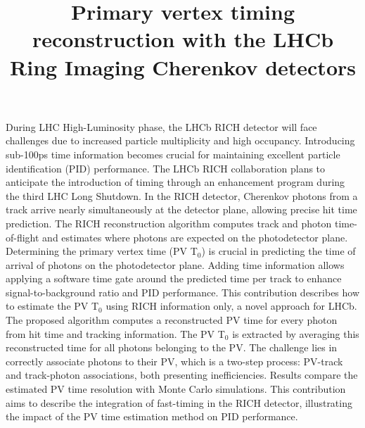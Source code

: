 \documentclass{article}
\title{Primary vertex timing reconstruction with the LHCb Ring Imaging Cherenkov detectors }
\date{}
\begin{document}
\maketitle

During LHC High-Luminosity phase, the LHCb RICH detector will face challenges due to increased particle multiplicity and high occupancy. Introducing sub-100ps time information becomes crucial for maintaining excellent particle identification (PID) performance. The LHCb RICH collaboration plans to anticipate the introduction of timing through an enhancement program during the third LHC Long Shutdown. In the RICH detector, Cherenkov photons from a track arrive nearly simultaneously at the detector plane, allowing precise hit time prediction. The RICH reconstruction algorithm computes track and photon time-of-flight and estimates where photons are expected on the photodetector plane. Determining the primary vertex time (PV T$_0$) is crucial in predicting the time of arrival of photons on the photodetector plane. Adding time information allows applying a software time gate around the predicted time per track to enhance signal-to-background ratio and PID performance. This contribution describes how to estimate the PV T$_0$ using RICH information only, a novel approach for LHCb. The proposed algorithm computes a reconstructed PV time for every photon from hit time and tracking information. The PV T$_0$ is extracted by averaging this reconstructed time for all photons belonging to the PV. The challenge lies in correctly associate photons to their PV, which is a two-step process: PV-track and track-photon associations, both presenting inefficiencies. Results compare the estimated PV time resolution with Monte Carlo simulations. This contribution aims to describe the integration of fast-timing in the RICH detector, illustrating the impact of the PV time estimation method on PID performance.
\end{document}
